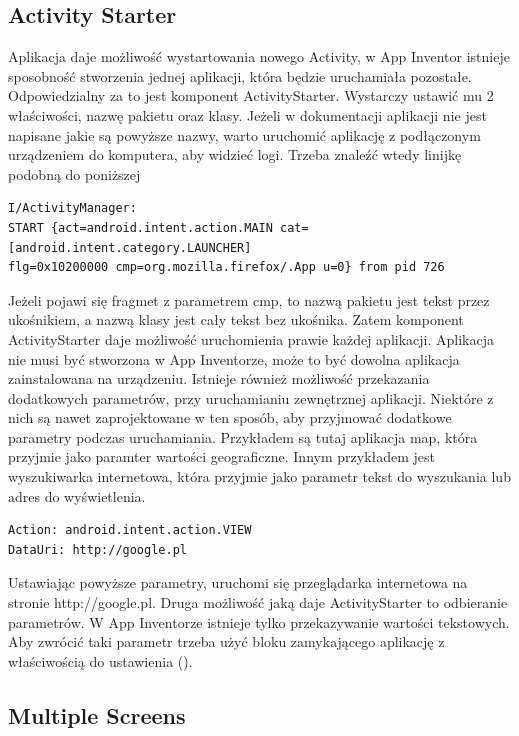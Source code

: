 \subsection{Activity Starter}

Aplikacja daje możliwość wystartowania nowego Activity, w App Inventor istnieje sposobność stworzenia jednej aplikacji, która będzie uruchamiała pozostałe. Odpowiedzialny za to jest komponent ActivityStarter. Wystarczy ustawić mu 2 właściwości, nazwę pakietu oraz klasy. Jeżeli w dokumentacji aplikacji nie jest napisane jakie są powyższe nazwy, warto uruchomić aplikację z podłączonym urządzeniem do komputera, aby widzieć logi. Trzeba znaleźć wtedy linijkę podobną do poniższej

\begin{lstlisting}
I/ActivityManager:
START {act=android.intent.action.MAIN cat=[android.intent.category.LAUNCHER]
flg=0x10200000 cmp=org.mozilla.firefox/.App u=0} from pid 726
\end{lstlisting}

Jeżeli pojawi się fragmet z parametrem cmp, to nazwą pakietu jest tekst przez ukośnikiem, a nazwą klasy jest cały tekst bez ukośnika. Zatem komponent ActivityStarter daje możliwość uruchomienia prawie każdej aplikacji. Aplikacja nie musi być stworzona w App Inventorze, może to być dowolna aplikacja zainstalowana na urządzeniu. Istnieje również możliwość przekazania dodatkowych parametrów, przy uruchamianiu zewnętrznej aplikacji. Niektóre z nich są nawet zaprojektowane w ten sposób, aby przyjmować dodatkowe parametry podczas uruchamiania. Przykładem są tutaj aplikacja map, która przyjmie jako paramter wartości geograficzne. Innym przykładem jest wyszukiwarka internetowa, która przyjmie jako parametr tekst do wyszukania lub adres do wyświetlenia.

\begin{lstlisting}
Action: android.intent.action.VIEW
DataUri: http://google.pl
\end{lstlisting}

Ustawiając powyższe parametry, uruchomi się przeglądarka internetowa na stronie http://google.pl. Druga możliwość jaką daje ActivityStarter to odbieranie parametrów. W App Inventorze istnieje tylko przekazywanie wartości tekstowych. Aby zwrócić taki parametr trzeba użyć bloku zamykającego aplikację z właściwością do ustawienia ().

\subsection{Multiple Screens}

